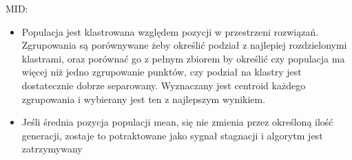 MID:
\begin{itemize}
    \item Populacja jest klastrowana względem pozycji w przestrzeni rozwiązań. Zgrupowania są porównywane żeby określić podział z najlepiej rozdzielonymi klastrami, oraz porównać go z pełnym zbiorem by określić czy populacja ma więcej niż jedno zgrupowanie punktów, czy podział na klastry jest dostatecznie dobrze separowany. Wyznaczany jest centroid każdego zgrupowania i wybierany jest ten z najlepszym wynikiem. 
    \item Jeśli średnia pozycja populacji mean, się nie zmienia przez określoną ilość generacji, zostaje to potraktowane jako sygnał stagnacji i algorytm jest zatrzymywany 

\end{itemize}
